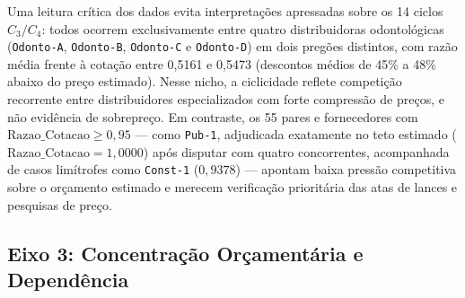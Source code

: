 \begin{table}[!t]
\centering
\caption{Exemplos representativos da triagem comportamental no Eixo 2 (inversão temporal $t_1 \neq t_2$ e proximidade do teto).}
\label{tab:eixo2_pares}
\end{table}

Uma leitura crítica dos dados evita interpretações apressadas sobre os 14 ciclos $C_3/C_4$: todos ocorrem exclusivamente entre quatro distribuidoras odontológicas (\texttt{Odonto-A}, \texttt{Odonto-B}, \texttt{Odonto-C} e \texttt{Odonto-D}) em dois pregões distintos, com razão média frente à cotação entre 0{,}5161 e 0{,}5473 (descontos médios de 45\% a 48\% abaixo do preço estimado). Nesse nicho, a ciclicidade reflete competição recorrente entre distribuidores especializados com forte compressão de preços, e não evidência de sobrepreço. Em contraste, os 55 pares e fornecedores com $\text{Razao\_Cotacao} \ge 0{,}95$ — como \texttt{Pub-1}, adjudicada exatamente no teto estimado ($\text{Razao\_Cotacao} = 1{,}0000$) após disputar com quatro concorrentes, acompanhada de casos limítrofes como \texttt{Const-1} ($0{,}9378$) — apontam baixa pressão competitiva sobre o orçamento estimado e merecem verificação prioritária das atas de lances e pesquisas de preço.

\subsection{Eixo 3: Concentração Orçamentária e Dependência}

